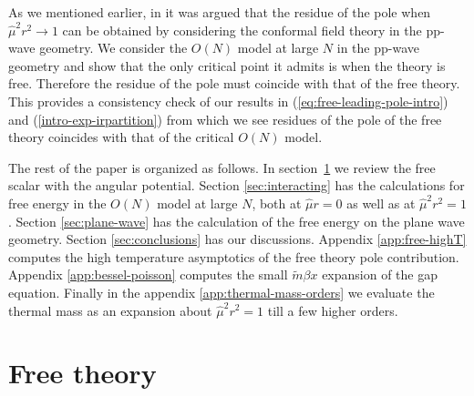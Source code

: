 \documentclass[a4paper,11pt]{article}
\newcommand{\secref}[1]{section~\ref{#1}}
\begin{document}
	As we mentioned earlier, in \cite{Komargodski:2026ain} it was argued 
	that the residue of the pole when $\hat \mu^2 r^2  \rightarrow 1$ can be obtained by
	considering the conformal field theory in the pp-wave geometry. 
	We consider the  $O(N)$ model  at large $N$ in the pp-wave geometry and show that the only   critical point it admits is 
	when the theory is free. Therefore the residue of the pole must coincide with that of the free theory. 
	This provides a consistency check of our results in  (\ref{eq:free-leading-pole-intro}) and (\ref{intro-exp-irpartition})
	from which we see residues  of the pole  of the free theory coincides 
	with that of the critical $O(N)$ model.  
	
	
	The rest of the paper is organized as follows. In \secref{sec:free} we review the free scalar with the angular potential. Section \ref{sec:interacting} has the calculations for free energy in the $O(N)$ model at large $N$, both at $\hat \mu r=0$ as well as at $\hat \mu^2r^2=1$. Section \ref{sec:plane-wave} has the calculation of the free energy on the plane wave geometry. Section \ref{sec:conclusions} has our discussions. Appendix \ref{app:free-highT} computes the high temperature asymptotics of the free theory pole contribution. Appendix \ref{app:bessel-poisson} computes the small $\tilde m\beta x$ expansion of the gap equation. Finally in the appendix \ref{app:thermal-mass-orders} we evaluate the thermal mass as an expansion about $\hat \mu^2r^2=1$ till a few higher orders.





\section{Free theory}
\label{sec:free}
\end{document}
